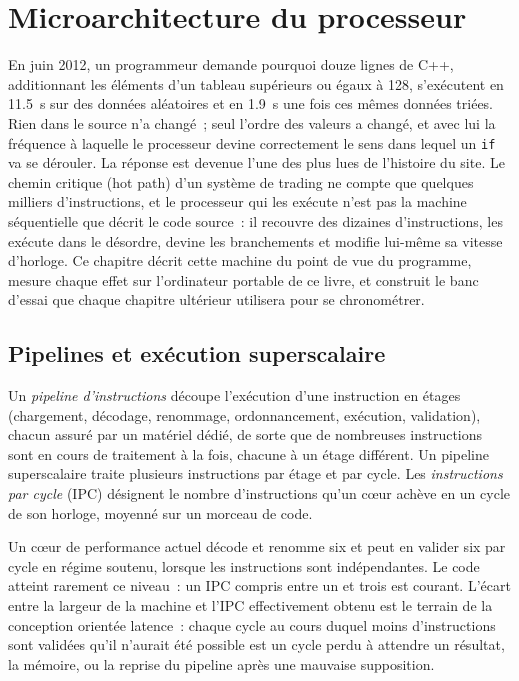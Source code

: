 \chapter{Microarchitecture du processeur}\label{ch:ll:cpu-microarchitecture}

En juin 2012, un programmeur demande pourquoi douze lignes de C++, additionnant les éléments d'un tableau supérieurs ou égaux à 128,
s'exécutent en 11.5~s sur des données aléatoires et en 1.9~s une fois ces mêmes données triées. Rien dans le source n'a
changé~; seul l'ordre des valeurs a changé, et avec lui la fréquence à laquelle le processeur devine correctement le sens dans lequel
un \texttt{if} va se dérouler. La réponse est devenue l'une des plus lues de l'histoire du site. Le chemin critique (hot path)
d'un système de trading ne compte que quelques milliers d'instructions, et le processeur qui les exécute n'est pas la machine séquentielle
que décrit le code source~: il recouvre des dizaines d'instructions, les exécute dans le désordre, devine les branchements et modifie
lui-même sa vitesse d'horloge. Ce chapitre décrit cette machine du point de vue du programme, mesure chaque effet sur l'ordinateur portable
de ce livre, et construit le banc d'essai que chaque chapitre ultérieur utilisera pour se chronométrer.

\section{Pipelines et exécution superscalaire}

\begin{definition}\label{def:ll:cpu-microarchitecture:pipeline}
Un \emph{pipeline d'instructions} découpe l'exécution d'une instruction en étages (chargement,
décodage, renommage, ordonnancement, exécution, validation), chacun assuré par un matériel dédié, de sorte que de nombreuses instructions
sont en cours de traitement à la fois, chacune à un étage différent. Un pipeline superscalaire traite plusieurs instructions par étage et par cycle.
Les \emph{instructions par cycle} (IPC) désignent le nombre d'instructions qu'un cœur achève en un cycle
de son horloge, moyenné sur un morceau de code.
\end{definition}

Un cœur de performance actuel décode et renomme six  et peut en valider six par cycle en régime soutenu,
lorsque les instructions sont indépendantes. Le code atteint rarement ce niveau~: un IPC compris entre un et trois est courant.
L'écart entre la largeur de la machine et l'IPC effectivement obtenu est le terrain de la conception orientée latence~: chaque
cycle au cours duquel moins d'instructions sont validées qu'il n'aurait été possible est un cycle perdu à attendre un résultat, la mémoire,
ou la reprise du pipeline après une mauvaise supposition.

